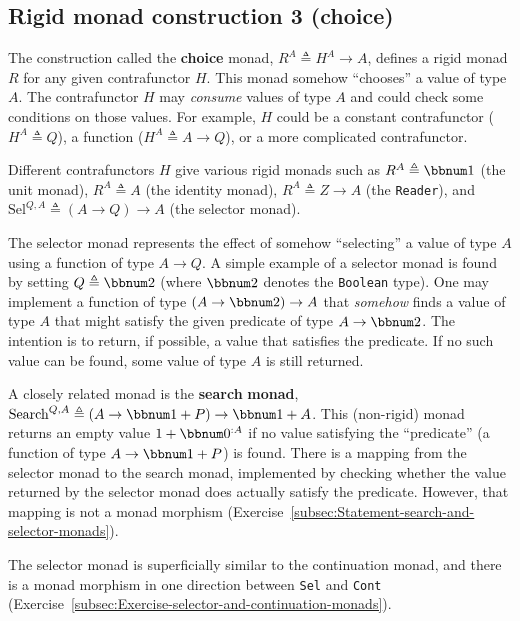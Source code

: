 \subsection{Rigid monad construction 3 (choice)\label{subsec:Rigid-monad-construction-1-choice}}

The construction called the \textbf{choice}
monad, $R^{A}\triangleq H^{A}\rightarrow A$, defines a rigid monad
$R$ for any given contrafunctor $H$. This monad somehow \textsf{``}chooses\textsf{''}
a value of type $A$. The contrafunctor $H$ may \emph{consume} values
of type $A$ and could check some conditions on those values. For
example, $H$ could be a constant contrafunctor ($H^{A}\triangleq Q$),
a function ($H^{A}\triangleq A\rightarrow Q$), or a more complicated
contrafunctor.

Different contrafunctors $H$ give various rigid monads such as $R^{A}\triangleq\bbnum 1$
(the unit monad), $R^{A}\triangleq A$ (the identity monad), $R^{A}\triangleq Z\rightarrow A$
(the \lstinline!Reader!), and $\text{Sel}^{Q,A}\triangleq\left(A\rightarrow Q\right)\rightarrow A$
(the selector monad). 

The selector monad represents the effect of somehow \textsf{``}selecting\textsf{''}
a value of type $A$ using a function of type $A\rightarrow Q$. A
simple example of a selector monad is found by setting $Q\triangleq\bbnum 2$
(where $\bbnum 2$ denotes the \lstinline!Boolean! type). One may
implement a function of type $\left(A\rightarrow\bbnum 2\right)\rightarrow A$
that \emph{somehow} finds a value of type $A$ that might satisfy
the given predicate of type $A\rightarrow\bbnum 2$. The intention
is to return, if possible, a value that satisfies the predicate. If
no such value can be found, some value of type $A$ is still returned.

A closely related monad is the \textbf{search} \textbf{monad},
$\text{Search}^{Q,A}\triangleq\left(A\rightarrow\bbnum 1+P\right)\rightarrow\bbnum 1+A$.
This (non-rigid) monad returns an empty value $1+\bbnum 0^{:A}$ if
no value satisfying the \textsf{``}predicate\textsf{''} (a function of type $A\rightarrow\bbnum 1+P$)
is found. There is a mapping from the selector monad to the search
monad, implemented by checking whether the value returned by the selector
monad does actually satisfy the predicate. However, that mapping is
not a monad morphism (Exercise~\ref{subsec:Statement-search-and-selector-monads}).

The selector monad is superficially similar to the continuation monad,
and there is a monad morphism in one direction between \lstinline!Sel!
and \lstinline!Cont! (Exercise~\ref{subsec:Exercise-selector-and-continuation-monads}).

